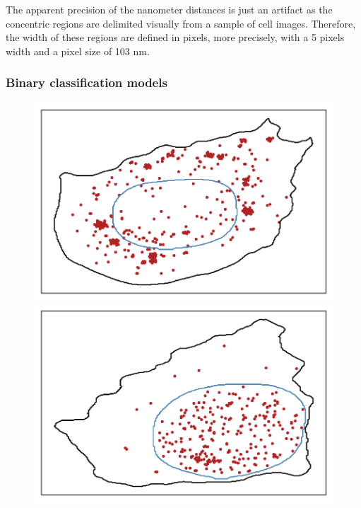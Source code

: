 The apparent precision of the nanometer distances is just an artifact as the concentric regions are delimited visually from a sample of cell images.
Therefore, the width of these regions are defined in pixels, more precisely, with a 5 pixels width and a pixel size of 103 nm.

\subsubsection{Binary classification models}

\begin{figure}[]
	\centering
		\includegraphics[trim={0.5cm 0.5cm 0.5cm 0.5cm},clip,width=\linewidth]{figures/chapter5/plot_foci}
	\endminipage\hfill
		\includegraphics[trim={0.5cm 0.5cm 0.5cm 0.5cm},clip,width=\linewidth]{figures/chapter5/plot_intranuclear}

\end{figure}
